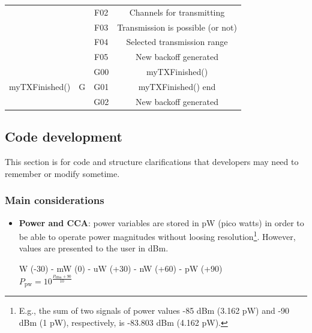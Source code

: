 \documentclass[a4paper]{article}
\begin{document}
\begin{table}[]
\begin{tabular}{|c|c|c|c|}
		                                           &                     & F02               & Channels for transmitting                               \\ \cline{3-4} 
		                                           &                     & F03               & Transmission is possible (or not)                       \\ \cline{3-4} 
		                                           &                     & F04               & Selected transmission range                             \\ \cline{3-4} 
		                                           &                     & F05               & New backoff generated                                   \\ \hline
		\multirow{3}{*}{myTXFinished()}            & \multirow{3}{*}{G}  & G00               & myTXFinished()                                          \\ \cline{3-4} 
		                                           &                     & G01               & myTXFinished() end                                      \\ \cline{3-4} 
		                                           &                     & G02               & New backoff generated                                   \\ \hline
		\end{tabular}
		\end{table}

	\subsection{Code development}
	\label{section:code_development}		
	This section is for code and structure clarifications that developers may need to remember or modify sometime. 

		\subsubsection{Main considerations}
		\begin{itemize}
		\item \textbf{Power and CCA}: power variables are stored in pW (pico watts) in order to be able to operate power magnitudes without loosing resolution\footnote{E.g., the sum of two signals of power values -85 dBm (3.162 pW) and -90 dBm (1 pW), respectively, is -83.803 dBm (4.162 pW).}. However, values are presented to the user in dBm.
		
		W (-30)  - mW (0)  - uW (+30) - nW (+60) - pW (+90)\\
		$P_{\text{pw}} = 10^{\frac{P_{\text{dBm}} + 90}{10}}$
		\end{itemize}
		
\end{document}
